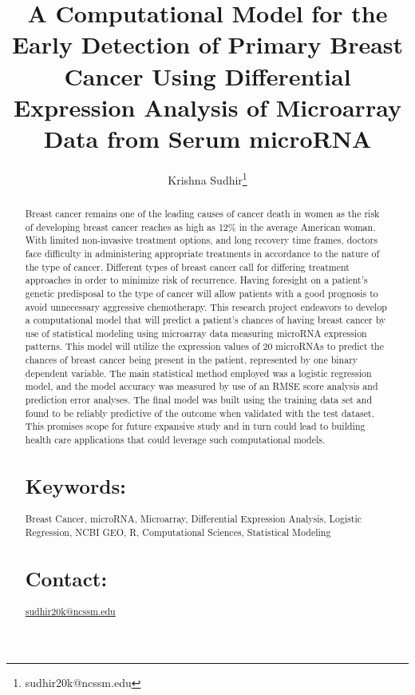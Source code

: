 \documentclass{bioinfo}
\begin{document}

\title[Microarray Analysis of miRNAs]{A Computational Model for the Early Detection of Primary Breast Cancer Using Differential Expression Analysis of Microarray Data from Serum microRNA}
\author[Krishna \textit{Sudhir}]{Krishna Sudhir\footnote{sudhir20k@ncssm.edu}}

\maketitle

\begin{abstract}

Breast cancer remains one of the leading causes of cancer death in women as the risk of developing breast cancer reaches as high as 12\% in the average American woman. With limited non-invasive treatment options, and long recovery time frames, doctors face difficulty in administering appropriate treatments in accordance to the nature of the type of cancer. Different types of breast cancer call for differing treatment approaches in order to minimize risk of recurrence. Having foresight on a patient’s genetic predisposal to the type of cancer will allow patients with a good prognosis to avoid unnecessary aggressive chemotherapy. This research project endeavors to develop a computational model that will predict a patient’s chances of having breast cancer by use of statistical modeling using microarray data measuring microRNA expression patterns. This model will utilize the expression values of 20 microRNAs to predict the chances of breast cancer being present in the patient, represented by one binary dependent variable. The main statistical method employed was a logistic regression model, and the model accuracy was measured by use of an RMSE score analysis and prediction error analyses. The final model was built using the training data set and found to be reliably predictive of the outcome when validated with the test dataset. This promises scope for future expansive study and in turn could lead to building health care applications that could leverage such computational models.

\section{Keywords:} Breast Cancer, microRNA, Microarray, Differential Expression Analysis, Logistic Regression, NCBI GEO, R, Computational Sciences, Statistical Modeling

\section{Contact:} \href{sudhir20k@ncssm.edu}{sudhir20k@ncssm.edu}
\end{abstract}
\end{document}
